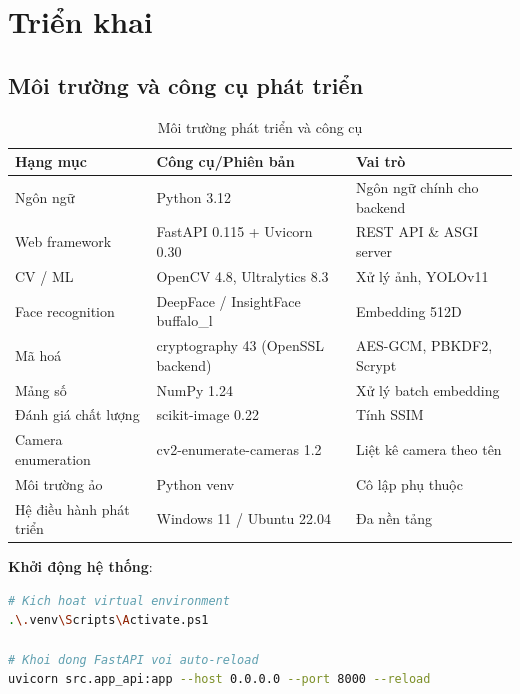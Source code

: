 \section{Triển khai}
\label{sec:trienkhai}

\subsection{Môi trường và công cụ phát triển}
\label{subsec:moitruong}

\begin{table}[H]
\centering
\caption{Môi trường phát triển và công cụ}
\label{tab:moitruong}
{\small\begin{tabularx}{\textwidth}{|l|X|l|}
\hline
\textbf{Hạng mục} & \textbf{Công cụ/Phiên bản} & \textbf{Vai trò} \\
\hline
Ngôn ngữ & Python 3.12 & Ngôn ngữ chính cho backend \\
Web framework & FastAPI 0.115 + Uvicorn 0.30 & REST API \& ASGI server \\
CV / ML & OpenCV 4.8, Ultralytics 8.3 & Xử lý ảnh, YOLOv11 \\
Face recognition & DeepFace / InsightFace buffalo\_l & Embedding 512D \\
Mã hoá & cryptography 43 (OpenSSL backend) & AES-GCM, PBKDF2, Scrypt \\
Mảng số & NumPy 1.24 & Xử lý batch embedding \\
Đánh giá chất lượng & scikit-image 0.22 & Tính SSIM \\
Camera enumeration & cv2-enumerate-cameras 1.2 & Liệt kê camera theo tên \\
Môi trường ảo & Python venv & Cô lập phụ thuộc \\
Hệ điều hành phát triển & Windows 11 / Ubuntu 22.04 & Đa nền tảng \\
\hline
\end{tabularx}}
\end{table}

\textbf{Khởi động hệ thống}:
\begin{lstlisting}[language=bash, caption={Lệnh khởi động server}]
# Kich hoat virtual environment
.\.venv\Scripts\Activate.ps1

# Khoi dong FastAPI voi auto-reload
uvicorn src.app_api:app --host 0.0.0.0 --port 8000 --reload
\end{lstlisting}

